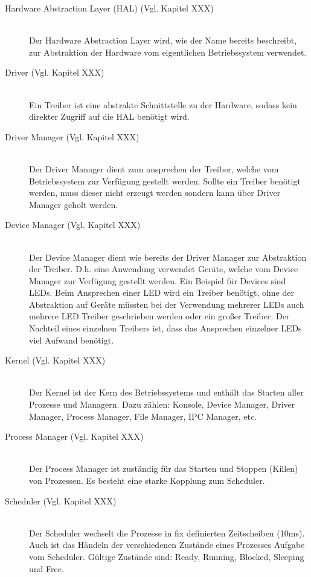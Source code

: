 \begin{description}
	\item[Hardware Abstraction Layer (HAL) (Vgl. Kapitel XXX)] \hfill \\
	Der Hardware Abstraction Layer wird, wie der Name bereits beschreibt, zur Abstraktion der Hardware vom eigentlichen Betriebssystem verwendet.
	
	\item[Driver (Vgl. Kapitel XXX)] \hfill \\
	Ein Treiber ist eine abstrakte Schnittstelle zu der Hardware, sodass kein direkter Zugriff auf die HAL benötigt wird.
	
	\item[Driver Manager (Vgl. Kapitel XXX)] \hfill \\
	Der Driver Manager dient zum ansprechen der Treiber, welche vom Betriebssystem zur Verfügung gestellt werden. Sollte ein Treiber benötigt werden, muss dieser nicht erzeugt werden sondern kann über Driver Manager geholt werden. 
	
	\item[Device Manager (Vgl. Kapitel XXX)] \hfill \\
	Der Device Manager dient wie bereits der Driver Manager zur Abstraktion der Treiber. D.h. eine Anwendung verwendet Geräte, welche vom Device Manager zur Verfügung gestellt werden. Ein Beispiel für Devices sind LEDs. Beim Ansprechen einer LED wird ein Treiber benötigt, ohne der Abstraktion auf Geräte müssten bei der Verwendung mehrerer LEDs auch mehrere LED Treiber geschrieben werden oder ein großer Treiber. Der Nachteil eines einzelnen Treibers ist, dass das Ansprechen einzelner LEDs viel Aufwand benötigt.
	
	\item[Kernel (Vgl. Kapitel XXX)] \hfill \\
	Der Kernel ist der Kern des Betriebssystems und enthält das Starten aller Prozesse und Managern. Dazu zählen: Konsole, Device Manager, Driver Manager, Process Manager, File Manager, IPC Manager, etc.
	
	\item[Process Manager (Vgl. Kapitel XXX)] \hfill \\
	Der Process Manager ist zuständig für das Starten und Stoppen (Killen) von Prozessen. Es besteht eine starke Kopplung zum Scheduler.
	
	\item[Scheduler (Vgl. Kapitel XXX)] \hfill \\
	Der Scheduler wechselt die Prozesse in fix definierten Zeitscheiben (10ms). Auch ist das Händeln der verschiedenen Zustände eines Prozesses Aufgabe vom Scheduler. Gültige Zustände sind: Ready, Running, Blocked, Sleeping und Free.
	

\end{description}
